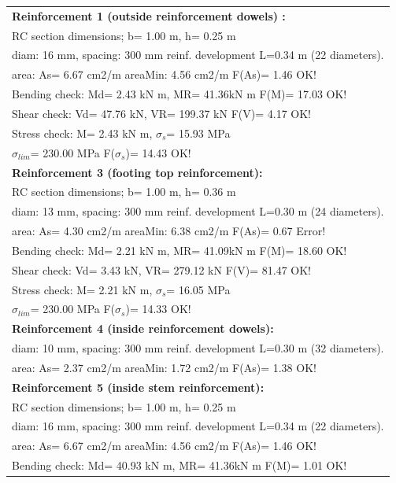 \begin{center}
\begin{supertabular}[H]{|l|}
\hline
\textbf{Reinforcement 1 (outside reinforcement dowels) :} \\
  RC section dimensions; b= 1.00 m, h= 0.25 m\\
  diam: 16 mm, spacing: 300 mm  reinf. development L=0.34 m (22 diameters).\\
  area: As=   6.67 cm2/m areaMin:   4.56 cm2/m  F(As)= 1.46 OK!\\
  Bending check: Md=   2.43 kN m, MR=  41.36kN m  F(M)= 17.03 OK!\\
  Shear check: Vd=  47.76 kN,  VR= 199.37 kN  F(V)= 4.17 OK!\\
  Stress check: M=   2.43 kN m, $\sigma_s$=  15.93 MPa\\
    $\sigma_{lim}$= 230.00 MPa  F($\sigma_s$)= 14.43 OK!\\
\textbf{Reinforcement 3 (footing top reinforcement):}\\
  RC section dimensions; b= 1.00 m, h= 0.36 m\\
  diam: 13 mm, spacing: 300 mm  reinf. development L=0.30 m (24 diameters).\\
  area: As=   4.30 cm2/m areaMin:   6.38 cm2/m  F(As)= 0.67 Error!\\
  Bending check: Md=   2.21 kN m, MR=  41.09kN m  F(M)= 18.60 OK!\\
  Shear check: Vd=   3.43 kN,  VR= 279.12 kN  F(V)= 81.47 OK!\\
  Stress check: M=   2.21 kN m, $\sigma_s$=  16.05 MPa\\
    $\sigma_{lim}$= 230.00 MPa  F($\sigma_s$)= 14.33 OK!\\
\textbf{Reinforcement 4 (inside reinforcement dowels):}\\
  diam: 10 mm, spacing: 300 mm  reinf. development L=0.30 m (32 diameters).\\
  area: As=   2.37 cm2/m areaMin:   1.72 cm2/m  F(As)= 1.38 OK!\\
\textbf{Reinforcement 5 (inside stem reinforcement):}\\
  RC section dimensions; b= 1.00 m, h= 0.25 m\\
  diam: 16 mm, spacing: 300 mm  reinf. development L=0.34 m (22 diameters).\\
  area: As=   6.67 cm2/m areaMin:   4.56 cm2/m  F(As)= 1.46 OK!\\
  Bending check: Md=  40.93 kN m, MR=  41.36kN m  F(M)= 1.01 OK!\\

\end{supertabular}
\end{center}
